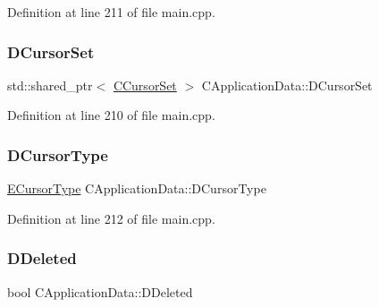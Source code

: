 Definition at line 211 of file main.\+cpp.

\hypertarget{classCApplicationData_aab67bfc9fa6708d7900ff654f9da05c7}{}\label{classCApplicationData_aab67bfc9fa6708d7900ff654f9da05c7} 
\subsubsection{\texorpdfstring{D\+Cursor\+Set}{DCursorSet}}
{\footnotesize\ttfamily std\+::shared\+\_\+ptr$<$ \hyperlink{classCCursorSet}{C\+Cursor\+Set} $>$ C\+Application\+Data\+::\+D\+Cursor\+Set\hspace{0.3cm}{\ttfamily [protected]}}



Definition at line 210 of file main.\+cpp.

\hypertarget{classCApplicationData_a931cfbda23231fb441081f231326e7ee}{}\label{classCApplicationData_a931cfbda23231fb441081f231326e7ee} 
\subsubsection{\texorpdfstring{D\+Cursor\+Type}{DCursorType}}
{\footnotesize\ttfamily \hyperlink{classCApplicationData_ad024b66b60017c45c47a85dbc636ae69}{E\+Cursor\+Type} C\+Application\+Data\+::\+D\+Cursor\+Type\hspace{0.3cm}{\ttfamily [protected]}}



Definition at line 212 of file main.\+cpp.

\hypertarget{classCApplicationData_a0a8651f95f3d48befd6e02a286ecdc82}{}\label{classCApplicationData_a0a8651f95f3d48befd6e02a286ecdc82} 
\subsubsection{\texorpdfstring{D\+Deleted}{DDeleted}}
{\footnotesize\ttfamily bool C\+Application\+Data\+::\+D\+Deleted\hspace{0.3cm}{\ttfamily [protected]}}



